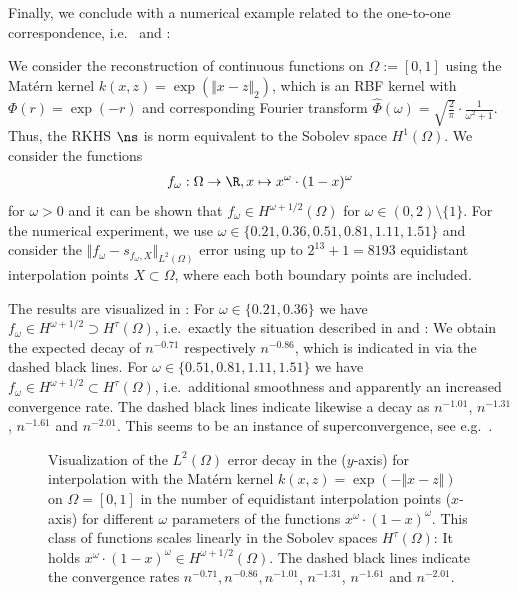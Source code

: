 \documentclass[a4paper, 10pt]{article}
\newlength\fwidth
\begin{document}
Finally, we conclude with a numerical example related to the one-to-one correspondence,
i.e.\  and :

\begin{example} %
We consider the reconstruction of continuous functions on $\Omega := [0, 1]$ using the Matérn kernel $k(x, z) = \exp(\Vert x - z \Vert_2)$,
 which is an RBF kernel with $\Phi(r) = \exp(-r)$ and corresponding Fourier transform $\hat{\Phi}(\omega) = \sqrt{\frac{2}{\pi}} \cdot \frac{1}{\omega^2 + 1}$.
Thus, the RKHS $\ns$ is norm equivalent to the Sobolev space $H^1(\Omega)$.
We consider the functions
\begin{align*}
f_\omega: \Omega \rightarrow \R, x \mapsto x^\omega \cdot (1-x)^\omega
\end{align*}
for $\omega > 0$ and it can be shown that $f_\omega \in H^{\omega + 1/2}(\Omega)$ for $\omega \in (0, 2) \setminus \{ 1 \}$.
%
For the numerical experiment, we use %
$\omega \in \{ 0.21, 0.36, 0.51, 0.81, 1.11, 1.51 \}$ 
and consider the $\Vert f_\omega - s_{f_\omega, X} \Vert_{L^2(\Omega)}$ error using up to $2^{13} + 1 = 8193$ equidistant interpolation points $X \subset \Omega$,
where each both boundary points are included.

The results are visualized in :
For $\omega \in \{ 0.21, 0.36 \}$ we have $f_\omega \in H^{\omega + 1/2} \supset H^\tau(\Omega)$, i.e.\ exactly the situation described in  and : 
We obtain the expected decay of $n^{-0.71}$ respectively $n^{-0.86}$, which is indicated in  via the dashed black lines.
For $\omega \in \{ 0.51, 0.81, 1.11, 1.51 \}$ we have $f_\omega \in H^{\omega + 1/2} \subset H^\tau(\Omega)$, i.e.\ additional smoothness and apparently an increased convergence rate.
The dashed black lines indicate likewise a decay as $n^{-1.01}$, $n^{-1.31}$, $n^{-1.61}$ and $n^{-2.01}$.
This seems to be an instance of superconvergence, see e.g.\ \cite{schaback2018superconvergence}.


%
%


\begin{figure}[hbt!]
\centering
\setlength{}
%
%
%
	
%
\caption{Visualization of the $L^2(\Omega)$ error decay in the ($y$-axis) for interpolation with the Matérn kernel $k(x, z) = \exp(-\Vert x - z \Vert)$ on $\Omega = [0,1]$ in the number of equidistant interpolation points ($x$-axis) for different $\omega$ parameters of the functions $x^\omega \cdot (1-x)^\omega$.
This class of functions scales linearly in the Sobolev spaces $H^\tau(\Omega)$: 
It holds $x^\omega \cdot (1-x)^\omega \in H^{\omega + 1/2}(\Omega)$.
The dashed black lines indicate the convergence rates $n^{-0.71}, n^{-0.86}, n^{-1.01}$, $n^{-1.31}$, $n^{-1.61}$ and $n^{-2.01}$.}
\label{fig:matern_L2_error}
\end{figure}

\end{example}
\end{document}
